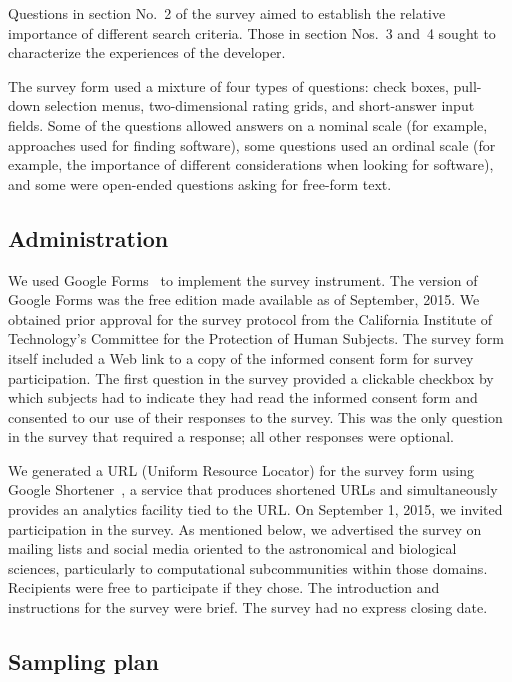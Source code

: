 \documentclass[review]{elsarticle}
\begin{document}
Questions in section No.~2 of the survey aimed to establish the relative importance of different search criteria.  Those in section Nos.~3 and~4 sought to characterize the experiences of the developer.

The survey form used a mixture of four types of questions: check boxes, pull-down selection menus, two-dimensional rating grids, and short-answer input fields.  Some of the questions allowed answers on a nominal scale (for example, approaches used for finding software), some questions used an ordinal scale (for example, the importance of different considerations when looking for software), and some were open-ended questions asking for free-form text.


\subsection{Administration}

We used Google Forms~\citep{googleforms} to implement the survey instrument.  The version of Google Forms was the free edition made available as of September, 2015.  We obtained prior approval for the survey protocol from the California Institute of Technology's Committee for the Protection of Human Subjects.  The survey form itself included a Web link to a copy of the informed consent form for survey participation.  The first question in the survey provided a clickable checkbox by which subjects had to indicate they had read the informed consent form and consented to our use of their responses to the survey.  This was the only question in the survey that required a response; all other responses were optional.

We generated a URL (Uniform Resource Locator) for the survey form using Google Shortener~\citep{googl}, a service that produces shortened URLs and simultaneously provides an analytics facility tied to the URL.  On September 1, 2015, we invited participation in the survey.  As mentioned below, we advertised the survey on mailing lists and social media oriented to the astronomical and biological sciences, particularly to computational subcommunities within those domains.  Recipients were free to participate if they chose.  The introduction and instructions for the survey were brief.  The survey had no express closing date.


\subsection{Sampling plan}
\label{sampling-plan}
\end{document}
